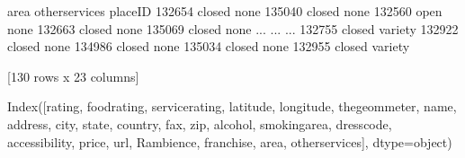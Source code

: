 \documentclass[letterpaper,10pt,english]{jupyterBook}
\begin{document}
\begin{sphinxVerbatim}[commandchars=\\\{\}]
           area other\PYGZus{}services  
placeID                         
132654   closed           none  
135040   closed           none  
132560     open           none  
132663   closed           none  
135069   closed           none  
...         ...            ...  
132755   closed        variety  
132922   closed           none  
134986   closed           none  
135034   closed           none  
132955   closed        variety  

[130 rows x 23 columns]
\end{sphinxVerbatim}

\begin{sphinxVerbatim}[commandchars=\\\{\}]
\end{sphinxVerbatim}

\begin{sphinxVerbatim}[commandchars=\\\{\}]
Index([\PYGZsq{}rating\PYGZsq{}, \PYGZsq{}food\PYGZus{}rating\PYGZsq{}, \PYGZsq{}service\PYGZus{}rating\PYGZsq{}, \PYGZsq{}latitude\PYGZsq{}, \PYGZsq{}longitude\PYGZsq{},
       \PYGZsq{}the\PYGZus{}geom\PYGZus{}meter\PYGZsq{}, \PYGZsq{}name\PYGZsq{}, \PYGZsq{}address\PYGZsq{}, \PYGZsq{}city\PYGZsq{}, \PYGZsq{}state\PYGZsq{}, \PYGZsq{}country\PYGZsq{}, \PYGZsq{}fax\PYGZsq{},
       \PYGZsq{}zip\PYGZsq{}, \PYGZsq{}alcohol\PYGZsq{}, \PYGZsq{}smoking\PYGZus{}area\PYGZsq{}, \PYGZsq{}dress\PYGZus{}code\PYGZsq{}, \PYGZsq{}accessibility\PYGZsq{},
       \PYGZsq{}price\PYGZsq{}, \PYGZsq{}url\PYGZsq{}, \PYGZsq{}Rambience\PYGZsq{}, \PYGZsq{}franchise\PYGZsq{}, \PYGZsq{}area\PYGZsq{}, \PYGZsq{}other\PYGZus{}services\PYGZsq{}],
      dtype=\PYGZsq{}object\PYGZsq{})
\end{sphinxVerbatim}

\begin{sphinxVerbatim}[commandchars=\\\{\}]
\PYG{p}{[}\PYG{p}{[}  \PYG{p}{]}\PYG{p}{]}
\end{sphinxVerbatim}
\end{document}
